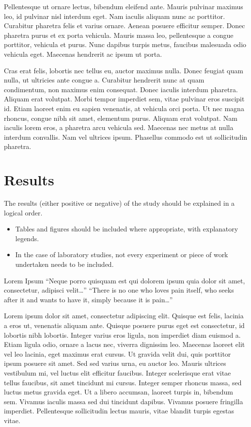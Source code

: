 \documentclass[
  11pt,
  a4paper,
]{scrreprt}
\providecommand{\tightlist}{%
  \setlength{\itemsep}{0pt}\setlength{\parskip}{0pt}}\usepackage{longtable,booktabs,array}
\begin{document}
Pellentesque ut ornare lectus, bibendum eleifend ante. Mauris pulvinar
maximus leo, id pulvinar nisl interdum eget. Nam iaculis aliquam nunc ac
porttitor. Curabitur pharetra felis et varius ornare. Aenean posuere
efficitur semper. Donec pharetra purus et ex porta vehicula. Mauris
massa leo, pellentesque a congue porttitor, vehicula et purus. Nunc
dapibus turpis metus, faucibus malesuada odio vehicula eget. Maecenas
hendrerit ac ipsum ut porta.

Cras erat felis, lobortis nec tellus eu, auctor maximus nulla. Donec
feugiat quam nulla, ut ultricies ante congue a. Curabitur hendrerit nunc
at quam condimentum, non maximus enim consequat. Donec iaculis interdum
pharetra. Aliquam erat volutpat. Morbi tempor imperdiet sem, vitae
pulvinar eros suscipit id. Etiam laoreet enim eu sapien venenatis, at
vehicula orci porta. Ut nec magna rhoncus, congue nibh sit amet,
elementum purus. Aliquam erat volutpat. Nam iaculis lorem eros, a
pharetra arcu vehicula sed. Maecenas nec metus at nulla interdum
convallis. Nam vel ultrices ipsum. Phasellus commodo est ut sollicitudin
pharetra.


\chapter{Results}\label{results}

The results (either positive or negative) of the study should be
explained in a logical order.

\begin{itemize}
\tightlist
\item
  Tables and figures should be included where appropriate, with
  explanatory legends.
\item
  In the case of laboratory studies, not every experiment or piece of
  work undertaken needs to be included.
\end{itemize}

Lorem Ipsum ``Neque porro quisquam est qui dolorem ipsum quia dolor sit
amet, consectetur, adipisci velit\ldots{}'' ``There is no one who loves
pain itself, who seeks after it and wants to have it, simply because it
is pain\ldots{}''

Lorem ipsum dolor sit amet, consectetur adipiscing elit. Quisque est
felis, lacinia a eros ut, venenatis aliquam ante. Quisque posuere purus
eget est consectetur, id lobortis nibh lobortis. Integer varius eros
ligula, non imperdiet diam euismod a. Etiam ligula odio, ornare a lacus
nec, viverra dignissim leo. Maecenas laoreet elit vel leo lacinia, eget
maximus erat cursus. Ut gravida velit dui, quis porttitor ipsum posuere
sit amet. Sed sed varius urna, eu auctor leo. Mauris ultrices vestibulum
mi, vel luctus elit efficitur faucibus. Integer scelerisque erat vitae
tellus faucibus, sit amet tincidunt mi cursus. Integer semper rhoncus
massa, sed luctus metus gravida eget. Ut a libero accumsan, laoreet
turpis in, bibendum sem. Vivamus iaculis massa sed dui tincidunt
dapibus. Vivamus posuere fringilla imperdiet. Pellentesque sollicitudin
lectus mauris, vitae blandit turpis egestas vitae.
\end{document}
